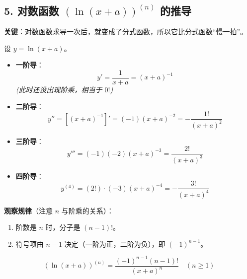 \documentclass[12pt,a4paper]{article}
\begin{document}
\newpage
\subsection*{5. 对数函数 $(\ln(x+a))^{(n)}$ 的推导}
\textbf{关键}：对数函数求导一次后，就变成了分式函数，所以它比分式函数“慢一拍”。

\begin{derivebox}
设 $y = \ln(x+a)$。
\begin{itemize}
    \item \textbf{一阶导}：
    \[ y' = \dfrac{1}{x+a} = (x+a)^{-1} \]
    \textit{(此时还没出现阶乘，相当于 $0!$)}
    
    \item \textbf{二阶导}：
    \[ y'' = \left[ (x+a)^{-1} \right]' = (-1)(x+a)^{-2} = -\dfrac{1!}{(x+a)^2} \]
    
    \item \textbf{三阶导}：
    \[ y''' = (-1)(-2)(x+a)^{-3} = \dfrac{2!}{(x+a)^3} \]
    
    \item \textbf{四阶导}：
    \[ y^{(4)} = (2!) \cdot (-3)(x+a)^{-4} = -\dfrac{3!}{(x+a)^4} \]
\end{itemize}
\textbf{观察规律}（注意 $n$ 与阶乘的关系）：
\begin{enumerate}
    \item 阶数是 $n$ 时，分子是 $(n-1)!$。
    \item 符号项由 $n-1$ 决定（一阶为正，二阶为负），即 $(-1)^{n-1}$。
\end{enumerate}
\[
\boxed{(\ln(x+a))^{(n)} = \dfrac{(-1)^{n-1} (n-1)!}{(x+a)^n}} \quad (n \geq 1)
\]
\end{derivebox}
\end{document}

